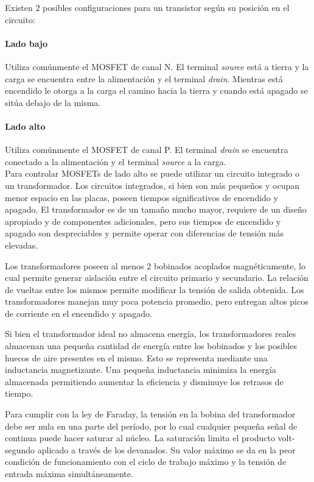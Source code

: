 Existen 2 posibles configuraciones para un transistor según su posición en el circuito:

\paragraph{Lado bajo} Utiliza comúnmente el MOSFET de canal N. 
El terminal \textit{source} está a tierra y la carga se encuentra entre la alimentación y el terminal \textit{drain}. 
Mientras está encendido le otorga a la carga el camino hacia la tierra y cuando está apagado se sitúa debajo de la misma. 

\paragraph{Lado alto} Utiliza comúnmente el MOSFET de canal P. 
El terminal \textit{drain} se encuentra conectado a la alimentación y el terminal \textit{source} a la carga.\\


Para controlar MOSFETs de lado alto se puede utilizar un circuito integrado o un transformador. 
Los circuitos integrados, si bien son más pequeños y ocupan menor espacio en las placas, 
poseen tiempos significativos de encendido y apagado. 
El transformador es de un tamaño mucho mayor, requiere de un diseño apropiado y de componentes adicionales,
pero sus tiempos de encendido y apagado son despreciables y permite operar con diferencias de tensión más elevadas.

Los transformadores poseen al menos 2 bobinados acoplados magnéticamente, 
lo cual permite generar aislación entre el circuito primario y secundario. 
La relación de vueltas entre los mismos permite modificar la tensión de salida obtenida. 
Los transformadores manejan muy poca potencia promedio, pero entregan altos picos de corriente en el encendido y apagado.

Si bien el transformador ideal no almacena energía, los transformadores reales 
almacenan una pequeña cantidad de energía entre los bobinados y los posibles huecos de aire presentes en el mismo. 
Esto se representa mediante una inductancia magnetizante. 
Una pequeña inductancia minimiza la energía almacenada permitiendo aumentar la eficiencia y disminuye los retrasos de tiempo. 

Para cumplir con la ley de Faraday, la tensión en la bobina del transformador debe ser nula en una parte del período, 
por lo cual cualquier pequeña señal de continua puede hacer saturar al núcleo. 
La saturación limita el producto volt-segundo aplicado a través de los devanados. 
Su valor máximo se da en la peor condición de funcionamiento con el ciclo de trabajo máximo y la tensión de entrada máxima simultáneamente. 

